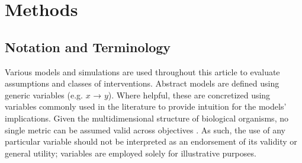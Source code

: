 \documentclass[twocolumn]{article} %
\begin{document}
\section{Methods}

\subsection{Notation and Terminology}
Various models and simulations are used throughout this article to evaluate assumptions and classes of interventions. Abstract models are defined using generic variables (e.g. $x$ → $y$). Where helpful, these are concretized using variables commonly used in the literature to provide intuition for the models’ implications. Given the multidimensional structure of biological organisms, no single metric can be assumed valid across objectives \cite{hu2025house, hu2024apples}. As such, the use of any particular variable should not be interpreted as an endorsement of its validity or general utility; variables are employed solely for illustrative purposes.
\end{document}
